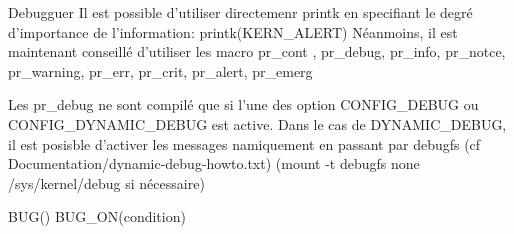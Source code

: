 

\begin{frame}{ Debugguer}
Il est possible d'utiliser directemenr printk en specifiant le degré d'importance de l'information:
printk(KERN_ALERT)
Néanmoins, il est maintenant conseillé d'utiliser les macro pr_cont , pr_debug, pr_info, pr_notce, pr_warning, pr_err, pr_crit, pr_alert, pr_emerg

Les pr_debug ne sont compilé que si l'une des option CONFIG_DEBUG ou CONFIG_DYNAMIC_DEBUG est active. Dans le cas de DYNAMIC_DEBUG, il est posisble d'activer les messages namiquement en passant par debugfs (cf Documentation/dynamic-debug-howto.txt)
(mount -t debugfs none /sys/kernel/debug si nécessaire)

BUG()
BUG_ON(condition)
\end{frame} 
